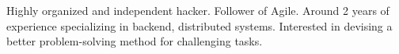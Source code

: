 

\begin{cvparagraph}

Highly organized and independent hacker. Follower of Agile. Around 2 years of experience specializing in backend, distributed systems. Interested in devising a better problem-solving method for challenging tasks.
\end{cvparagraph}